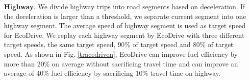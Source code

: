 \textbf{Highway}.  
We divide highway trips into road segments based on deceleration.
If the deceleration is larger than a threshold, we separate current
segment into one highway segment.
The average speed of highway segment is used as target speed for EcoDrive. 
We replay each highway segment by EcoDrive with three different
target speeds, the same target speed, 90\% of target speed and
80\% of target speed. 
As shown in Fig. \ref{tracedriven}, EcoDrive can improve
fuel efficiency by more than 20\% on average without sacrificing 
travel time and can improve an average of 40\% fuel efficiency
by sacrificing 10\% travel time on highway. 


   

 
